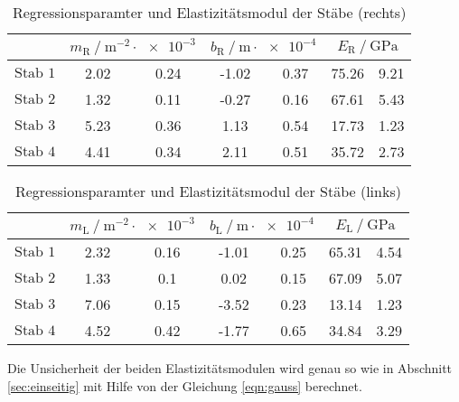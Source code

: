 \begin{table}
  \centering
  \caption{Regressionsparamter und Elastizitätsmodul der Stäbe (rechts)}
  \label{tab:regressiondouble}
  \begin{tabular} {S[table-format=3.0] 
    S[table-format=1.2] @{${}\pm{}$} S[table-format=1.2]
    S[table-format=1.2] @{${}\pm{}$} S[table-format=1.2]  
    S[table-format=3.2] @{${}\pm{}$} S[table-format=2.2]}
  \toprule
  &  & 
     & 
    \\
  \midrule
  {$\text{Stab 1}$}  & 2.02 & 0.24 & -1.02 & 0.37 & 75.26 & 9.21 \\
  {$\text{Stab 2}$}  & 1.32 & 0.11 & -0.27 & 0.16 & 67.61 & 5.43 \\
  {$\text{Stab 3}$}  & 5.23 & 0.36 & 1.13  & 0.54 & 17.73 & 1.23 \\ 
  {$\text{Stab 4}$}  & 4.41 & 0.34 & 2.11  & 0.51 & 35.72 & 2.73 \\
  \bottomrule
  \end{tabular}
\end{table}
\begin{table}
  \centering
  \caption{Regressionsparamter und Elastizitätsmodul der Stäbe (links)}
  \label{tab:regressiondoublelinks}
  \begin{tabular} {S[table-format=3.0]  
    S[table-format=1.2] @{${}\pm{}$} S[table-format=1.2]
    S[table-format=1.2] @{${}\pm{}$} S[table-format=1.2]
    S[table-format=3.2] @{${}\pm{}$} S[table-format=2.2]}
  \toprule
  &  & 
     &
    \\
  \midrule
  {$\text{Stab 1}$} & 2.32 & 0.16 & -1.01 & 0.25 & 65.31 & 4.54\\
  {$\text{Stab 2}$} & 1.33 & 0.1  & 0.02  & 0.15 & 67.09 & 5.07\\
  {$\text{Stab 3}$} & 7.06 & 0.15 & -3.52 & 0.23 & 13.14 & 1.23\\ 
  {$\text{Stab 4}$} & 4.52 & 0.42 & -1.77 & 0.65 & 34.84 & 3.29\\
  \bottomrule
  \end{tabular}
\end{table}
Die Unsicherheit der beiden Elastizitätsmodulen wird genau so wie in Abschnitt \ref{sec:einseitig} mit Hilfe von der 
Gleichung \eqref{eqn:gauss} berechnet.